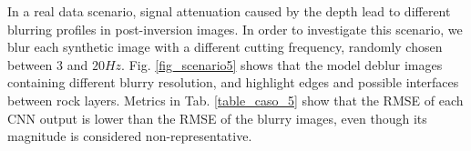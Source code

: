\documentclass[conference]{IEEEtran}
\begin{document}
In a real data scenario, signal attenuation caused by the depth lead to
different blurring profiles in post-inversion images.
In order to investigate this scenario, we blur each synthetic image with a different
cutting frequency, randomly chosen between $3$ and $20 Hz$. 
Fig. \ref{fig_scenario5} shows that the model deblur images containing different blurry resolution, and
highlight edges and possible interfaces between rock layers. Metrics in Tab. \ref{table_caso_5} show that the RMSE of each CNN output is lower than the RMSE of the blurry images, even though its magnitude is considered non-representative.
\begin{figure}[!t]
\centering
{}
\end{figure}
\end{document}
